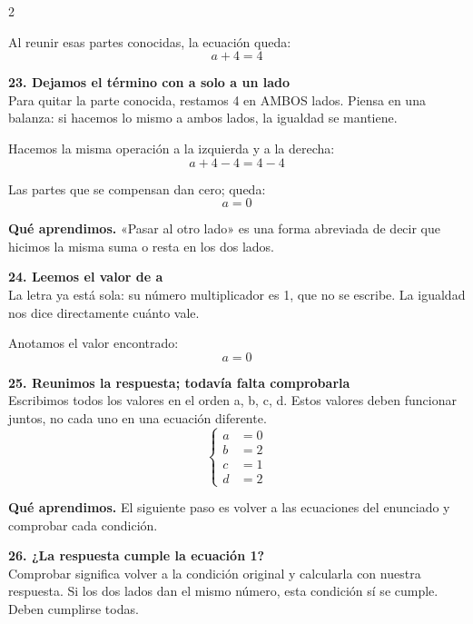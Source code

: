 \documentclass[11pt,a4paper,landscape]{article}
\begin{document}
\begin{multicols*}{2}
\begin{minipage}{\linewidth}
\par\smallskip Al reunir esas partes conocidas, la ecuación queda:
\[a + 4=4\]
\end{minipage}\par\medskip
\noindent\begin{minipage}{\linewidth}\textbf{23. Dejamos el término con a solo a un lado}\\[2pt]Para quitar la parte conocida, restamos 4 en AMBOS lados. Piensa en una balanza: si hacemos lo mismo a ambos lados, la igualdad se mantiene.
\par\smallskip Hacemos la misma operación a la izquierda y a la derecha:
\[a + 4 - 4=4 - 4\]
\par\smallskip Las partes que se compensan dan cero; queda:
\[a=0\]
\par\smallskip\textbf{Qué aprendimos.} «Pasar al otro lado» es una forma abreviada de decir que hicimos la misma suma o resta en los dos lados.
\end{minipage}\par\medskip
\noindent\begin{minipage}{\linewidth}\textbf{24. Leemos el valor de a}\\[2pt]La letra ya está sola: su número multiplicador es 1, que no se escribe. La igualdad nos dice directamente cuánto vale.
\par\smallskip Anotamos el valor encontrado:
\[a=0\]
\end{minipage}\par\medskip
\noindent\begin{minipage}{\linewidth}\textbf{25. Reunimos la respuesta; todavía falta comprobarla}\\[2pt]Escribimos todos los valores en el orden a, b, c, d. Estos valores deben funcionar juntos, no cada uno en una ecuación diferente.
\[\left\{\begin{aligned}a&=0\\b&=2\\c&=1\\d&=2\end{aligned}\right.\]
\par\smallskip\textbf{Qué aprendimos.} El siguiente paso es volver a las ecuaciones del enunciado y comprobar cada condición.
\end{minipage}\par\medskip
\noindent\begin{minipage}{\linewidth}\textbf{26. ¿La respuesta cumple la ecuación 1?}\\[2pt]Comprobar significa volver a la condición original y calcularla con nuestra respuesta. Si los dos lados dan el mismo número, esta condición sí se cumple. Deben cumplirse todas.

\end{minipage}
\end{multicols*}
\end{document}
